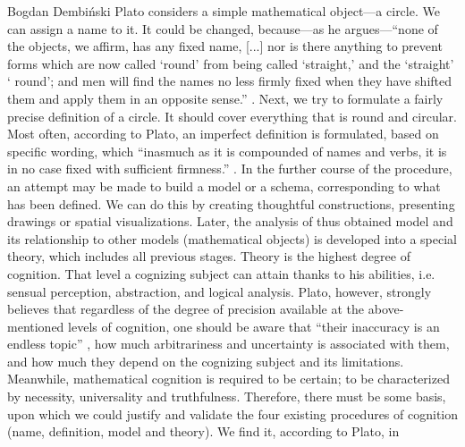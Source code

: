 \begin{artengenv}{Bogdan Dembiński}
Plato considers a simple mathematical object---a circle. We can assign a name to it. It could be changed, because---as he
argues---``none of the objects, we affirm, has any fixed name, [...] nor is there anything to prevent forms which are now
called ‘round’ from being called ‘straight,’ and the ‘straight’ ‘%
round’; and men will find the names no less firmly fixed when they have shifted them and apply them in an opposite
sense.''
\parencite[Letters , 343b]{plato_platonis_1955}.
Next, we try to formulate a fairly precise definition
of a circle. It should cover everything that is round and circular. Most often, according to Plato, an imperfect
definition is formulated, based on specific wording, which ``inasmuch as it is compounded of names and verbs, it is in
no case fixed with sufficient firmness.''
\parencite[Letters , 343b]{plato_platonis_1955}.
In the further course
of the procedure, an attempt may be made to build a model or a schema, corresponding to what has been defined. We can
do this by creating thoughtful constructions, presenting drawings or spatial visualizations. Later, the analysis of
thus obtained model and its relationship to other models (mathematical objects) is developed into a special theory,
which includes all previous stages. Theory is the highest degree of cognition.  That level a cognizing subject can
attain thanks to his abilities, i.e. sensual perception, abstraction, and logical analysis. Plato, however, strongly
believes that regardless of the degree of precision available at the above-mentioned levels of cognition, one should be
aware that ``their inaccuracy is an endless topic''
\parencite[Letters , 343b]{plato_platonis_1955},
how much
arbitrariness and uncertainty is associated with them, and how much they depend on the cognizing subject and its
limitations. Meanwhile, mathematical cognition is required to be certain; to be characterized by necessity,
universality and truthfulness. Therefore, there must be some basis, upon which we could justify and validate the four
existing procedures of cognition (name, definition, model and theory). We find it, according to Plato, in%

\end{artengenv}
